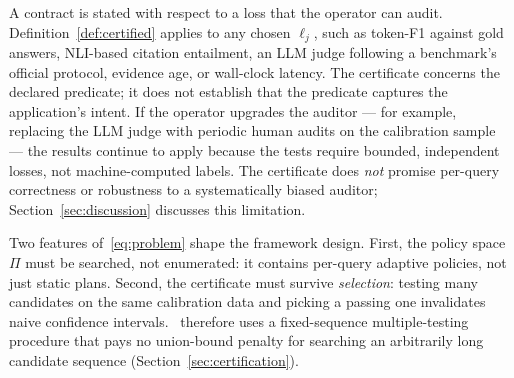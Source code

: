 \begin{rmk}
A contract is stated with respect to a loss that the operator can audit.
Definition~\ref{def:certified} applies to any chosen $\ell_j$, such as
token-F1 against gold
answers, NLI-based citation entailment, an LLM judge following a
benchmark's official protocol, evidence age, or wall-clock latency.
The certificate concerns the declared predicate; it does not establish
that the predicate captures the application's intent.
If the operator upgrades the auditor --- for example, replacing the LLM
judge with periodic human audits on the calibration sample --- the
results continue to apply because the tests require bounded,
independent losses, not machine-computed labels. The certificate does
\emph{not} promise
per-query correctness or robustness to a systematically biased
auditor; Section~\ref{sec:discussion} discusses this limitation.
\end{rmk}

Two features of~\eqref{eq:problem} shape the framework design. First,
the policy space $\Pi$ must be searched, not enumerated: it contains
per-query adaptive policies, not just static plans. Second, the
certificate must survive \emph{selection}: testing many candidates on
the same calibration data and picking a passing one invalidates naive
confidence intervals. \system\ therefore uses a fixed-sequence
multiple-testing procedure that pays no union-bound penalty for
searching an arbitrarily long candidate sequence
(Section~\ref{sec:certification}).
